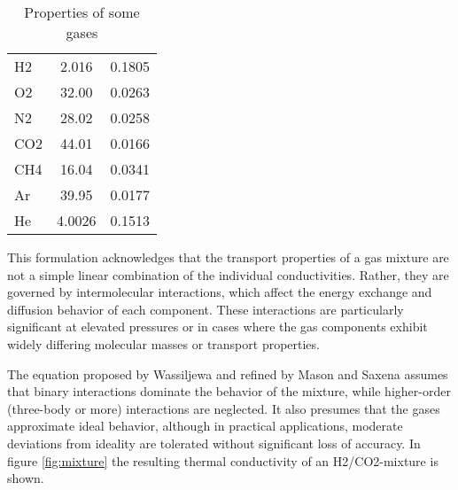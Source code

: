 \begin{table}
\centering
\caption{Properties of some gases}
\label{table:gas-probs}
\begin{tabular}{lSS}
\toprule
{} &  &  \\
\midrule
H2 & 2.016 & 0.1805 \\
O2 & 32.00 & 0.0263 \\
N2 & 28.02 & 0.0258 \\
CO2 & 44.01 & 0.0166 \\
CH4 & 16.04 & 0.0341 \\
Ar & 39.95 & 0.0177 \\
He & 4.0026 & 0.1513 \\
\bottomrule
\end{tabular}
\end{table}This formulation acknowledges that the transport properties of a gas mixture are not a simple
linear combination of the individual conductivities. Rather, they are governed by intermolecular
interactions, which affect the energy exchange and diffusion behavior of each component. These
interactions are particularly significant at elevated pressures or in cases where the gas components
exhibit widely differing molecular masses or transport properties.

The equation proposed by Wassiljewa and refined by Mason and Saxena assumes that binary interactions
dominate the behavior of the mixture, while higher-order (three-body or more) interactions are
neglected. It also presumes that the gases approximate ideal behavior, although in practical
applications, moderate deviations from ideality are tolerated without significant loss of accuracy.
In figure \ref{fig:mixture} the resulting thermal conductivity of an H2/CO2-mixture is shown.


